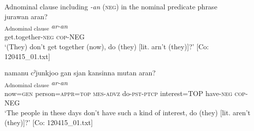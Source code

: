 \exi{}  Adnominal clause including \textit{-an} (\textsc{neg}) in the nominal predicate phrase
\ex{}\\
    \glll  jurawan  aran?\\
      [\textit{juraw-an}]\textsubscript{Adnominal clause}  \textit{ar-an}\\
      get.together-\textsc{neg}  \textsc{cop}-NEG\\
      \glt       ‘(They) don’t get together (now), do (they) [lit. arn’t (they)]?’ [Co: 120415\_01.txt]

\ex  %
     \glll namanu  cˀjunkjoo  gan  sjan  {\textbar}kansin{\textbar}na  mutan  aran?\\
      [\textit{nama=nu}  \textit{cˀju=nkja=ja}  \textit{ga-n}  \textit{sɨr-tar-n} \textit{kansin=ja}  \textit{mut-an}]\textsubscript{Adnominal clause}  \textit{ar-an}\\
      now=\textsc{gen}  person=\textsc{appr}=\textsc{top}  \textsc{mes}-\textsc{advz}  do-\textsc{pst}-\textsc{ptcp}  interest=TOP  have-\textsc{neg}  \textsc{cop}-NEG\\
      \glt ‘The people in these days don’t have such a kind of interest, do (they) [lit. aren’t (they)]?’     [Co: 120415\_01.txt]
    \z
\z

